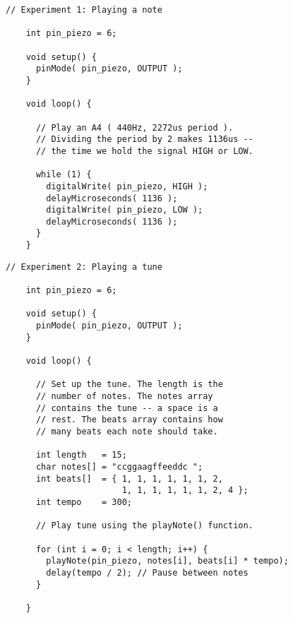\begin{minipage}[t]{0.49\tw}
  \vspace{0.1in}
  \begin{Verbatim}[gobble=3,fontsize=\small]
    // Experiment 1: Playing a note

    int pin_piezo = 6;

    void setup() {
      pinMode( pin_piezo, OUTPUT );
    }

    void loop() {

      // Play an A4 ( 440Hz, 2272us period ).
      // Dividing the period by 2 makes 1136us --
      // the time we hold the signal HIGH or LOW.

      while (1) {
        digitalWrite( pin_piezo, HIGH );
        delayMicroseconds( 1136 );
        digitalWrite( pin_piezo, LOW );
        delayMicroseconds( 1136 );
      }
    }
  \end{Verbatim}
  \vspace{0.1in}
  \begin{Verbatim}[gobble=3,fontsize=\small]
    // Experiment 2: Playing a tune

    int pin_piezo = 6;

    void setup() {
      pinMode( pin_piezo, OUTPUT );
    }

    void loop() {

      // Set up the tune. The length is the
      // number of notes. The notes array
      // contains the tune -- a space is a
      // rest. The beats array contains how
      // many beats each note should take.

      int length   = 15;
      char notes[] = "ccggaagffeeddc ";
      int beats[]  = { 1, 1, 1, 1, 1, 1, 2,
                       1, 1, 1, 1, 1, 1, 2, 4 };
      int tempo    = 300;

      // Play tune using the playNote() function.

      for (int i = 0; i < length; i++) {
        playNote(pin_piezo, notes[i], beats[i] * tempo);
        delay(tempo / 2); // Pause between notes
      }

    }
  \end{Verbatim}
\end{minipage}
\vspace{0.1in}


